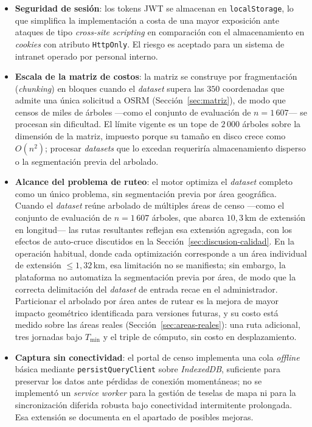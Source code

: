 \begin{itemize}
  \item \textbf{Seguridad de sesión}: los tokens JWT se almacenan en
  \texttt{localStorage}, lo que simplifica la implementación a costa de una
  mayor exposición ante ataques de tipo \textit{cross-site scripting} en
  comparación con el almacenamiento en \textit{cookies} con atributo
  \texttt{HttpOnly}. El riesgo es aceptado para un sistema de intranet
  operado por personal interno.

  \item \textbf{Escala de la matriz de costos}: la matriz se construye por
  fragmentación (\textit{chunking}) en bloques cuando el \textit{dataset}
  supera las $350$ coordenadas que admite una única solicitud a OSRM
  (Sección~\ref{sec:matriz}), de modo que censos de miles de árboles ---como
  el conjunto de evaluación de $n = 1\,607$--- se procesan sin dificultad. El
  límite vigente es un tope de $2\,000$ árboles sobre la dimensión de la
  matriz, impuesto porque su tamaño en disco crece como $O(n^2)$; procesar
  \textit{datasets} que lo excedan requeriría almacenamiento disperso o la
  segmentación previa del arbolado.

  \item \textbf{Alcance del problema de ruteo}: el motor optimiza el
  \textit{dataset} completo como un único problema, sin segmentación previa
  por área geográfica. Cuando el \textit{dataset} reúne arbolado de múltiples
  áreas de censo ---como el conjunto de evaluación de $n = 1\,607$ árboles,
  que abarca $10{,}3$\,km de extensión en longitud--- las rutas resultantes
  reflejan esa extensión agregada, con los efectos de auto-cruce discutidos en la
  Sección~\ref{sec:discusion-calidad}. En la operación habitual, donde cada
  optimización corresponde a un área individual de extensión
  $\leq 1{,}32$\,km, esa limitación no se manifiesta; sin embargo, la
  plataforma no automatiza la segmentación previa por área, de modo que
  la correcta delimitación del \textit{dataset} de entrada recae en el
  administrador. Particionar el arbolado por área antes de rutear es la mejora
  de mayor impacto geométrico identificada para versiones futuras, y su costo
  está medido sobre las áreas reales (Sección~\ref{sec:areas-reales}): una ruta
  adicional, tres jornadas bajo $T_{\min}$ y el triple de cómputo, sin costo en
  desplazamiento.

  \item \textbf{Captura sin conectividad}: el portal de censo implementa una cola
  \textit{offline} básica mediante \texttt{persistQueryClient} sobre
  \textit{IndexedDB}, suficiente para preservar los datos ante pérdidas de conexión
  momentáneas; no se implementó un \textit{service worker} para la gestión de teselas
  de mapa ni para la sincronización diferida robusta bajo conectividad intermitente
  prolongada. Esa extensión se documenta en el apartado
  de posibles mejoras.


\end{itemize}
